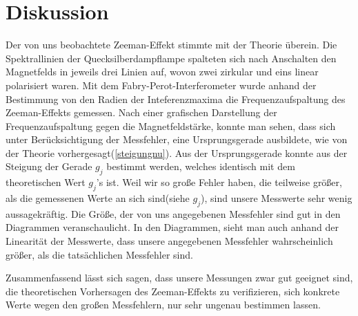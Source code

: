 \documentclass[10pt,a4paper]{article}
\begin{document}
\section{Diskussion}

Der von uns beobachtete Zeeman-Effekt stimmte mit der Theorie überein. Die Spektrallinien der Quecksilberdampflampe spalteten sich nach Anschalten den Magnetfelds in jeweils drei Linien auf, wovon zwei zirkular und eins linear polarisiert waren. Mit dem Fabry-Perot-Interferometer wurde anhand der Bestimmung von den Radien der Inteferenzmaxima die Frequenzaufspaltung des Zeeman-Effekts gemessen. Nach einer grafischen Darstellung der Frequenzaufspaltung gegen die Magnetfeldstärke, konnte man sehen, dass sich unter Berücksichtigung der Messfehler, eine Ursprungsgerade ausbildete, wie von der Theorie vorhergesagt(\ref{steigungnu}). Aus der Ursprungsgerade konnte aus der Steigung der Gerade $g_j$ bestimmt werden, welches identisch mit dem theoretischen Wert $g_j$'s ist. Weil wir so große Fehler haben, die teilweise größer, als die gemessenen Werte an sich sind(siehe $g_j$), sind unsere Messwerte sehr wenig aussagekräftig. Die Größe, der von uns angegebenen Messfehler sind gut in den Diagrammen veranschaulicht. In den Diagrammen, sieht man auch anhand der Linearität der Messwerte, dass unsere angegebenen Messfehler wahrscheinlich größer, als die tatsächlichen Messfehler sind.


Zusammenfassend lässt sich sagen, dass unsere Messungen zwar gut geeignet sind, die theoretischen Vorhersagen des Zeeman-Effekts zu verifizieren, sich konkrete Werte wegen den großen Messfehlern, nur sehr ungenau bestimmen lassen.
\end{document}
